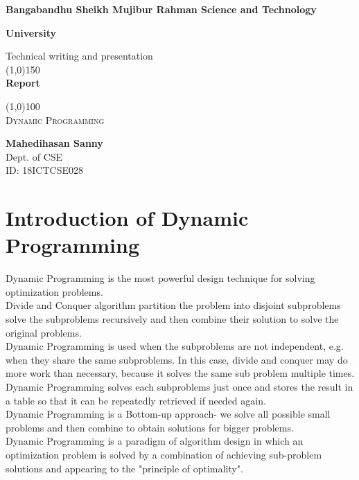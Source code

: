 \documentclass[11pt]{article}
\begin{document}
\begin{titlepage}

\textbf{Bangabandhu Sheikh Mujibur Rahman Science and Technology}
\begin{center}
\textbf{University\\}

\bigskip
\bigskip
\bigskip
\medskip
\bigskip
\bigskip
\medskip

Technical writing and presentation\\
\line(1,0){150}\\
[5mm]
\huge {\bfseries Report\\}

\line(1,0){100}\\
[.5mm]
\textsc{\Large Dynamic Programming}

\end{center} 
\vfill

\begin{flushright}

\textbf{\large Mahedihasan Sanny\\}
Dept. of CSE\\ 
ID: 18ICTCSE028\\

\end{flushright}
\end{titlepage}

\section*{Introduction of Dynamic Programming\\}
Dynamic Programming is the most powerful design technique for solving optimization problems.\\
Divide and Conquer algorithm partition the problem into disjoint subproblems solve the subproblems recursively and then combine their solution to solve the original problems.\\
Dynamic Programming is used when the subproblems are not independent, e.g. when they share the same subproblems. In this case, divide and conquer may do more work than necessary, because it solves the same sub problem multiple times.\\
Dynamic Programming solves each subproblems just once and stores the result in a table so that it can be repeatedly retrieved if needed again.\\
Dynamic Programming is a Bottom-up approach- we solve all possible small problems and then combine to obtain solutions for bigger problems.\\
Dynamic Programming is a paradigm of algorithm design in which an optimization problem is solved by a combination of achieving sub-problem solutions and appearing to the "principle of optimality".\\
\end{document}
